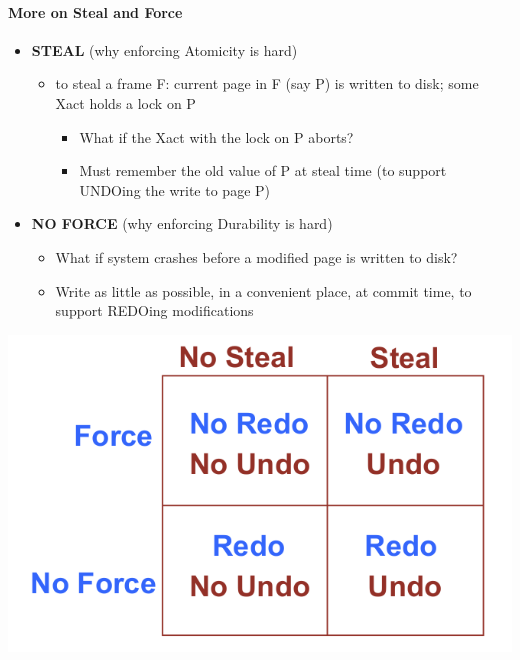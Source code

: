 \paragraph{More on Steal and Force}
\begin{itemize}
\item \textbf{STEAL} (why enforcing Atomicity is hard)
  \begin{itemize}
  \item to steal a frame F: current page in F (say P) is written to
    disk; some Xact holds a lock on P
    \begin{itemize}
    \item What if the Xact with the lock on P aborts?
    \item Must remember the old value of P at steal time
      (to support UNDOing the write to page P)
    \end{itemize}
  \end{itemize}

\item \textbf{NO FORCE} (why enforcing Durability is hard)
  \begin{itemize}
  \item What if system crashes before a modified page is written
    to disk?
  \item Write as little as possible, in a convenient place,
    at commit time, to support REDOing modifications
  \end{itemize}
\end{itemize}

\includegraphics[scale=0.15]{graphics/force-steal-matrix.png}


